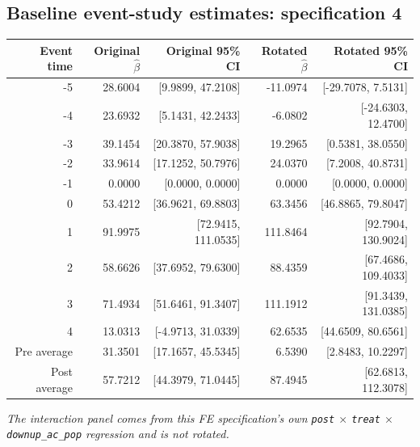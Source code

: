 \documentclass[10pt]{article}
\begin{document}
\subsection*{Baseline event-study estimates: specification 4}
\begin{center}
\scriptsize
\begin{tabular}{r rr rr}
\toprule
Event time & Original $\hat\beta$ & Original 95\% CI & Rotated $\hat\beta$ & Rotated 95\% CI \\
\midrule
-5 & 28.6004 & [9.9899, 47.2108] & -11.0974 & [-29.7078, 7.5131] \\
-4 & 23.6932 & [5.1431, 42.2433] & -6.0802 & [-24.6303, 12.4700] \\
-3 & 39.1454 & [20.3870, 57.9038] & 19.2965 & [0.5381, 38.0550] \\
-2 & 33.9614 & [17.1252, 50.7976] & 24.0370 & [7.2008, 40.8731] \\
-1 & 0.0000 & [0.0000, 0.0000] & 0.0000 & [0.0000, 0.0000] \\
0 & 53.4212 & [36.9621, 69.8803] & 63.3456 & [46.8865, 79.8047] \\
1 & 91.9975 & [72.9415, 111.0535] & 111.8464 & [92.7904, 130.9024] \\
2 & 58.6626 & [37.6952, 79.6300] & 88.4359 & [67.4686, 109.4033] \\
3 & 71.4934 & [51.6461, 91.3407] & 111.1912 & [91.3439, 131.0385] \\
4 & 13.0313 & [-4.9713, 31.0339] & 62.6535 & [44.6509, 80.6561] \\
\midrule
Pre average & 31.3501 & [17.1657, 45.5345] & 6.5390 & [2.8483, 10.2297] \\
Post average & 57.7212 & [44.3979, 71.0445] & 87.4945 & [62.6813, 112.3078] \\
\bottomrule
\end{tabular}
\end{center}
\medskip
\textit{The interaction panel comes from this FE specification's own \texttt{post} $\times$ \texttt{treat} $\times$ \texttt{downup\_ac\_pop} regression and is not rotated.}
\clearpage
\end{document}
